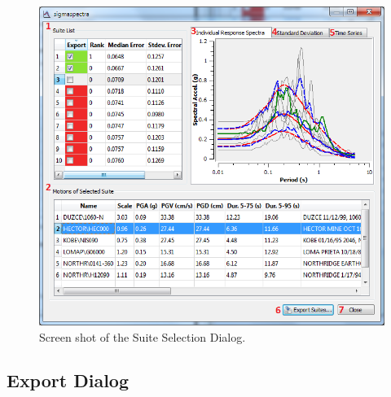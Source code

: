 \documentclass[11pt]{article}
\begin{document}
\begin{figure}[tbp]
  \begin{center}
	\includegraphics[width=\textwidth]{screenshots/suiteSelection}
  \end{center}
  \caption{Screen shot of the Suite Selection Dialog.}
  \label{fig:interface:suiteSelection}
\end{figure}

\subsection{Export Dialog}
\label{sec:interface:export}
\end{document}
